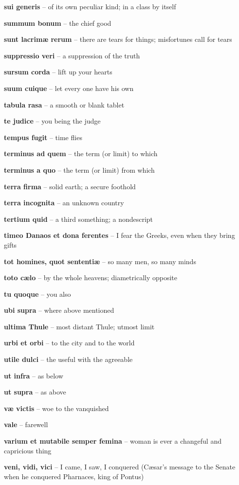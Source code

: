 \documentclass[12pt]{article}
\newcommand{\lat}[1]{\textbf{#1}}
\begin{document}
\lat{sui generis} -- of its own peculiar kind; in a class by itself

\lat{summum bonum} -- the chief good

\lat{sunt lacrim\ae{} rerum} -- there are tears for things; misfortunes call for tears

\lat{suppressio veri} -- a suppression of the truth

\lat{sursum corda} -- lift up your hearts

\lat{suum cuique} -- let every one have his own

\lat{tabula rasa} -- a smooth or blank tablet

\lat{te judice} -- you being the judge

\lat{tempus fugit} -- time flies

\lat{terminus ad quem} -- the term (or limit) to which

\lat{terminus a quo} -- the term (or limit) from which

\lat{terra firma} -- solid earth; a secure foothold

\lat{terra incognita} -- an unknown country

\lat{tertium quid} -- a third something; a nondescript

\lat{timeo Danaos et dona ferentes} -- I fear the Greeks, even when they bring gifts

\lat{tot homines, quot sententi\ae} -- so many men, so many minds

\lat{toto c{\ae}lo} -- by the whole heavens; diametrically opposite

\lat{tu quoque} -- you also

\lat{ubi supra} -- where above mentioned

\lat{ultima Thule} -- most distant Thule; utmost limit

\lat{urbi et orbi} -- to the city and to the world

\lat{utile dulci} -- the useful with the agreeable

\lat{ut infra} -- as below

\lat{ut supra} -- as above

\lat{v\ae{} victis} -- woe to the vanquished

\lat{vale} -- farewell

\lat{varium et mutabile semper femina} -- woman is ever a changeful and capricious thing

\lat{veni, vidi, vici} -- I came, I saw, I conquered (C{\ae}sar's message to the Senate when he conquered Pharnaces, king of Pontus)
\end{document}
